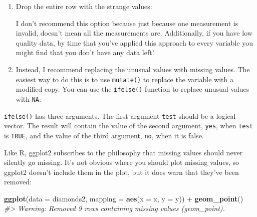 \documentclass[]{book}
\newenvironment{Shaded}{\begin{snugshade}}{\end{snugshade}}
\newcommand{\KeywordTok}[1]{\textcolor[rgb]{0.13,0.29,0.53}{\textbf{{#1}}}}
\newcommand{\DataTypeTok}[1]{\textcolor[rgb]{0.13,0.29,0.53}{{#1}}}
\newcommand{\DecValTok}[1]{\textcolor[rgb]{0.00,0.00,0.81}{{#1}}}
\newcommand{\StringTok}[1]{\textcolor[rgb]{0.31,0.60,0.02}{{#1}}}
\newcommand{\CommentTok}[1]{\textcolor[rgb]{0.56,0.35,0.01}{\textit{{#1}}}}
\newcommand{\OtherTok}[1]{\textcolor[rgb]{0.56,0.35,0.01}{{#1}}}
\newcommand{\NormalTok}[1]{{#1}}
\begin{document}
\begin{enumerate}
\def\labelenumi{\arabic{enumi}.}
\item
  Drop the entire row with the strange values:

\begin{Shaded}
\end{Shaded}

  I don't recommend this option because just because one measurement is
  invalid, doesn't mean all the measurements are. Additionally, if you
  have low quality data, by time that you've applied this approach to
  every variable you might find that you don't have any data left!
\item
  Instead, I recommend replacing the unusual values with missing values.
  The easiest way to do this is to use \texttt{mutate()} to replace the
  variable with a modified copy. You can use the \texttt{ifelse()}
  function to replace unusual values with \texttt{NA}:

\begin{Shaded}
\end{Shaded}
\end{enumerate}

\texttt{ifelse()} has three arguments. The first argument \texttt{test}
should be a logical vector. The result will contain the value of the
second argument, \texttt{yes}, when \texttt{test} is \texttt{TRUE}, and
the value of the third argument, \texttt{no}, when it is false.

Like R, ggplot2 subscribes to the philosophy that missing values should
never silently go missing. It's not obvious where you should plot
missing values, so ggplot2 doesn't include them in the plot, but it does
warn that they've been removed:

\begin{Shaded}
\begin{Highlighting}[]
\KeywordTok{ggplot}\NormalTok{(}\DataTypeTok{data =} \NormalTok{diamonds2, }\DataTypeTok{mapping =} \KeywordTok{aes}\NormalTok{(}\DataTypeTok{x =} \NormalTok{x, }\DataTypeTok{y =} \NormalTok{y)) +}\StringTok{ }
\StringTok{  }\KeywordTok{geom_point}\NormalTok{()}
\CommentTok{#> Warning: Removed 9 rows containing missing values (geom_point).}
\end{Highlighting}
\end{Shaded}
\end{document}
